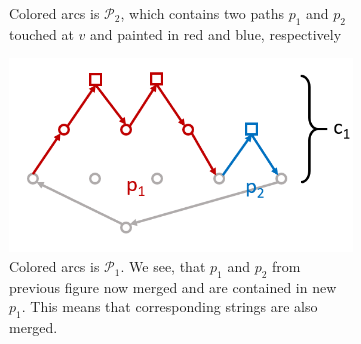 \documentclass[11pt]{article}
\begin{document}
\begin{figure}[h]
\begin{subfigure}[t]{0.3\textwidth}
			\caption{Colored arcs is $\mathcal{P}_2$, which contains two paths $p_1$ and $p_2$ touched at $v$ and painted in red and blue, respectively}
			\label{fig:1b}
		\end{subfigure}
		\hfil
		\begin{subfigure}[t]{0.3\textwidth}
			\includegraphics[width=\textwidth]{gha_is_greedy_img/fig3.png}
			\caption{Colored arcs is $\mathcal{P}_1$. We see, that $p_1$ and $p_2$ from previous figure now merged and are contained in new $p_1$. This means that corresponding strings are also merged.}
			\label{fig:1c}
		\end{subfigure}
	\caption{}
	\end{figure}
	
\end{document}
